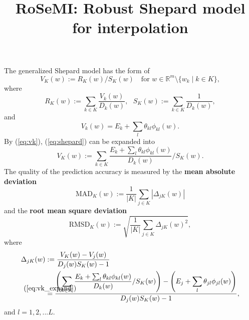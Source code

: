 \documentclass[12pt]{article}
\title{RoSeMI: Robust Shepard model for interpolation}
\newcommand{\defeq}[2]{\stackrel{\mathclap{\normalfont\mbox{#1}}}{#2}}
\def\D{\displaystyle}
\begin{document}
\maketitle
The generalized Shepard model has the form of 
\begin{equation}
    \label{eq:shepard}
    V_K(w):=R_K(w)/S_K(w) ~~~ \text{ for } w \in \mathbb{R}^m \setminus \{w_k\mid k\in K \},
\end{equation}
where
\begin{equation}
    R_K(w):=\sum_{k\in K} \frac{V_k(w)}{D_k(w)},~~~
    S_K(w):=\sum_{k\in K} \frac{1}{D_k(w)},
\end{equation}
and
\begin{equation}
    \label{eq:vk}
    V_k(w) = E_k + \sum_l \theta_{kl} \phi_{kl}(w).
\end{equation}
By (\ref{eq:vk}), (\ref{eq:shepard}) can be expanded into
\begin{equation}
    \label{eq:vk_expand}
    V_K(w) := \sum_{k\in K} \frac{E_k + \sum_l \theta_{kl} \phi_{kl}(w)}{D_k(w)} / S_K(w). 
\end{equation}
The quality of the prediction accuracy is measured by the \textbf{mean absolute deviation}
\begin{equation}
    \text{MAD}_K(w) := \frac{1}{|K|}\sum_{j\in K}|\Delta_{jK}(w)|
\end{equation}
and the \textbf{root mean square deviation}
\begin{equation}
    \text{RMSD}_K(w) := \sqrt{\frac{1}{|K|}\sum_{j\in K}\Delta_{jK}(w)^2},
\end{equation}
where
\begin{equation}
    \label{eq:delta}
    \begin{split}
        \Delta_{jK}(w)&:=\D\frac{V_K(w)-V_j(w)}{D_j(w)S_K(w)-1} \\
        &\defeq{(\refeq{eq:vk_expand})}{=} \frac{\D \left(\sum_{k\in K} \frac{E_k + \sum_l \theta_{kl} \phi_{kl}(w)}{D_k(w)} / S_K(w)\right) - \left(E_j + \sum_l \theta_{jl} \phi_{jl}(w)\right)}{D_j(w)S_K(w)-1}, \\
    \end{split}
\end{equation}
and $l=1,2,...L$.
\end{document}
